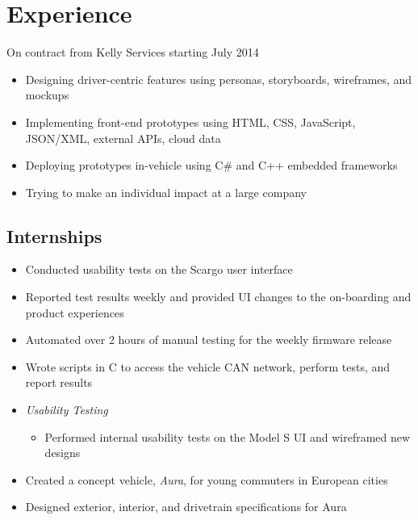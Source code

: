 \documentclass[10pt,a4paper,sans]{moderncv}        %
\begin{document}
\makecvtitle


\section{Experience}
\smallskip
{}
{On contract from Kelly Services starting July 2014}
{{}%
\begin{itemize} 
	\item Designing driver-centric features using personas, storyboards, wireframes, and mockups 
	\item  Implementing front-end prototypes using HTML, CSS, JavaScript, JSON/XML, external APIs, cloud data
	\item  Deploying prototypes in-vehicle using C\# and C++ embedded frameworks
	\item Trying to make an individual impact at a large company
\end{itemize}}

\bigskip
\subsection{Internships}
\bigskip
{}
{{}%
\begin{itemize} 
	\item  Conducted usability tests on the Scargo user interface
	\item  Reported test results weekly and provided UI changes to the on-boarding and product experiences
\end{itemize}}

{{}%
\begin{itemize} 
	\item  Automated over 2 hours of manual testing for the weekly firmware release
	\item  Wrote scripts in C to access the vehicle CAN network, perform tests, and report results
	\smallskip
	\item \textit{Usability Testing}
		\begin{itemize} 
			\item  Performed internal usability tests on the Model S UI and wireframed new designs
		\end{itemize}
\end {itemize}}

{{}%
\begin{itemize} 
	\item  Created a concept vehicle, {\emph{Aura}}, for young commuters in European cities
	\item   Designed exterior, interior, and drivetrain specifications for Aura
\end{itemize}}
\end{document}
